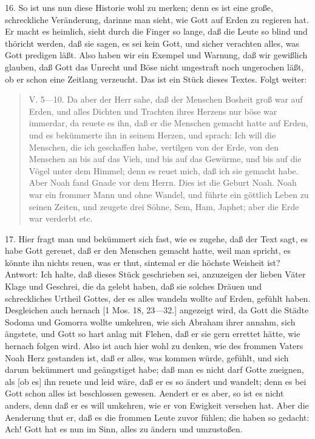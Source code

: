 16. So ist uns nun diese Historie wohl zu merken; denn es ist eine große, schreckliche Veränderung, darinne man sieht, wie Gott auf Erden zu regieren hat. Er macht es heimlich, sieht durch die Finger so lange, daß die Leute so blind und thöricht werden, daß sie sagen, es sei kein Gott, und sicher verachten alles, was Gott predigen läßt. Also haben wir ein Exempel und Warnung, daß wir gewißlich glauben, daß Gott das Unrecht und Böse nicht ungestraft noch ungerochen läßt, ob er schon eine Zeitlang verzeucht. Das ist ein Stück dieses Textes. Folgt weiter:

\begin{quote}
V. 5—10. Da aber der Herr sahe, daß der Menschen Bosheit groß war auf Erden, und alles Dichten und Trachten ihres Herzens nur böse war immerdar, da reuete es ihn, daß er die Menschen gemacht hatte auf Erden, und es bekümmerte ihn in seinem Herzen, und sprach: Ich will die Menschen, die ich geschaffen habe, vertilgen von der Erde, von den Menschen an bis auf das Vieh, und bis auf das Gewürme, und bis auf die Vögel unter dem Himmel; denn es reuet mich, daß ich sie gemacht habe. Aber Noah fand Gnade vor dem Herrn. Dies ist die Geburt Noah. Noah war ein frommer Mann und ohne Wandel, und führte ein göttlich Leben zu seinen Zeiten, und zeugete drei Söhne, Sem, Ham, Japhet; aber die Erde war verderbt etc.
\end{quote}

17. Hier fragt man und bekümmert sich fast, wie es zugehe, daß der Text sagt, es habe Gott gereuet, daß er den Menschen gemacht hatte, weil man spricht, es könnte ihn nichts reuen, was er thut, sintemal er die höchste Weisheit ist? Antwort: Ich halte, daß dieses Stück geschrieben sei, anzuzeigen der lieben Väter Klage und Geschrei, die da gelebt haben, daß sie solches Dräuen und schreckliches Urtheil Gottes, der es alles wandeln wollte auf Erden, gefühlt haben. Desgleichen auch hernach [1 Mos. 18, 23—32.] angezeigt wird, da Gott die Städte Sodoma und Gomorra wollte umkehren, wie sich Abraham ihrer annahm, sich ängstete, und Gott so hart anlag mit Flehen, daß er sie gern errettet hätte, wie hernach folgen wird. Also ist auch hier wohl zu denken, wie des frommen Vaters Noah Herz gestanden ist, daß er alles, was kommen würde, gefühlt, und sich darum bekümmert und geängstiget habe; daß man es nicht darf Gotte zueignen, als [ob es] ihn reuete und leid wäre, daß er es so ändert und wandelt; denn es bei Gott schon alles ist beschlossen gewesen. Aendert er es aber, so ist es nicht anders, denn daß er es will umkehren, wie er von Ewigkeit versehen hat. Aber die Aenderung thut er, daß es die frommen Leute zuvor fühlen; die haben so gedacht: Ach! Gott hat es nun im Sinn, alles zu ändern und umzustoßen.

